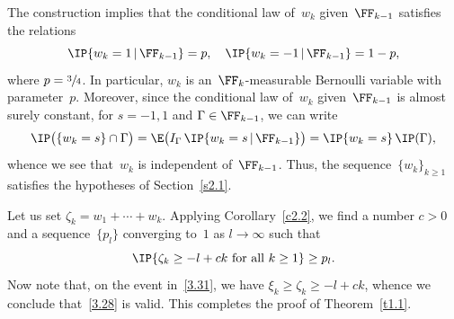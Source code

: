The construction implies that the conditional law of~$w_k$ given~$\FF_{k-1}$ satisfies the relations
\begin{equation} \label{2.1}
\IP\{w_k=1\,|\,\FF_{k-1}\}=p, \quad \IP\{w_k=-1\,|\,\FF_{k-1}\}=1-p,
\end{equation}
where $p=\sfrac34$. In particular, $w_k$ is an~$\FF_k$-measurable Bernoulli variable with parameter~$p$. Moreover, since the conditional law of~$w_k$ given~$\FF_{k-1}$ is almost surely constant, for $s=-1,1$ and $\Gamma\in\FF_{k-1}$, we can write
\[
\IP\bigl(\{w_k=s\}\cap \Gamma\bigr)
=\E\bigl(I_\Gamma\,\IP\{w_k=s\,|\,\FF_{k-1}\}\bigr)=\IP\{w_k=s\}\,\IP(\Gamma),
\]
whence we see that~$w_k$ is independent of~$\FF_{k-1}$. Thus, the sequence~$\{w_k\}_{k\ge1}$ satisfies the hypotheses of Section~\ref{s2.1}.

Let us set $\zeta_k=w_1+\cdots+w_k$. Applying Corollary~\ref{c2.2}, we find a number $c>0$ and a sequence~$\{p_l\}$ converging to~$1$ as $l\to\infty$ such that
\begin{equation} \label{3.31}
\IP\{\zeta_k\ge -l+ck\text{ for all $k\ge1$}\} \ge p_l.
\end{equation}
Now note that, on the event in~\eqref{3.31}, we have $\xi_k\ge\zeta_k\ge -l+ck$, whence we conclude that~\eqref{3.28} is valid. This completes the proof of Theorem~\ref{t1.1}.

